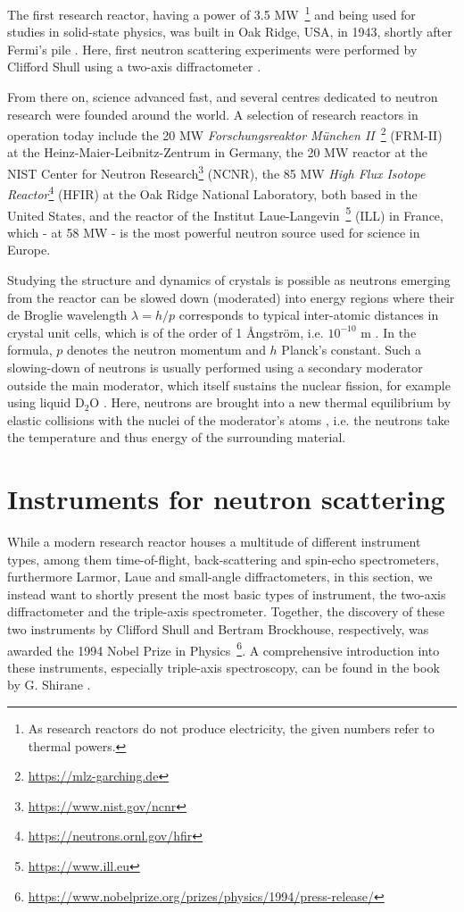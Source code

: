 The first research reactor, having a power of 3.5 MW~\footnote{As research reactors do not produce electricity, the given numbers refer to thermal powers.} and being used for studies in solid-state physics, was built in Oak Ridge, USA, in 1943, shortly after Fermi's pile \cite[p. 3]{Jacrot2021}.
Here, first neutron scattering experiments were performed by Clifford Shull using a two-axis diffractometer \cite[pp. 3, 37]{Jacrot2021}.

From there on, science advanced fast, and several centres dedicated to neutron research were founded around the world.
A selection of research reactors in operation today include the 20 MW \textit{Forschungsreaktor M\"unchen II}~\footnote{\url{https://mlz-garching.de}} (FRM-II) at the Heinz-Maier-Leibnitz-Zentrum in Germany, the 20 MW reactor at the NIST Center for Neutron Research\footnote{\url{https://www.nist.gov/ncnr}} (NCNR), the 85 MW \textit{High Flux Isotope Reactor}\footnote{\url{https://neutrons.ornl.gov/hfir}} (HFIR) at the Oak Ridge National Laboratory, both based in the United States, and the reactor of the Institut Laue-Langevin~\footnote{\url{https://www.ill.eu}} (ILL) in France, which - at 58 MW - is the most powerful neutron source used for science in Europe.

Studying the structure and dynamics of crystals is possible as neutrons emerging from the reactor can be slowed down (moderated) into energy regions where their de Broglie wavelength $\lambda = h/p$ \cite[p. 89]{Gross2012} corresponds to typical inter-atomic distances in crystal unit cells, which is of the order of 1 \AA{}ngstr\"om, i.e. $10^{-10}$ m \cite[pp.1,3]{Squires2012}. In the formula, $p$ denotes the neutron momentum and $h$ Planck's constant. Such a slowing-down of neutrons is usually performed using a secondary moderator outside the main moderator, which itself sustains the nuclear fission, for example using liquid $\mathrm{D_2O}$ \cite[p. 82]{Jacrot2021}. Here, neutrons are brought into a new thermal equilibrium by elastic collisions with the nuclei of the moderator's atoms \cite[p. 30]{Stacey2007}, i.e. the neutrons take the temperature and thus energy of the surrounding material.



\section{Instruments for neutron scattering \label{sec:instruments}}

While a modern research reactor houses a multitude of different instrument types, among them time-of-flight, back-scattering and spin-echo spectrometers, furthermore Larmor, Laue and small-angle diffractometers, in this section, we instead want to shortly present the most basic types of instrument, the two-axis diffractometer and the triple-axis spectrometer. Together, the discovery of these two instruments by Clifford Shull and Bertram Brockhouse, respectively, was awarded the 1994 Nobel Prize in Physics~\footnote{\url{https://www.nobelprize.org/prizes/physics/1994/press-release/}}. A comprehensive introduction into these instruments, especially triple-axis spectroscopy, can be found in the book by G. Shirane \cite{Shirane2002}.


